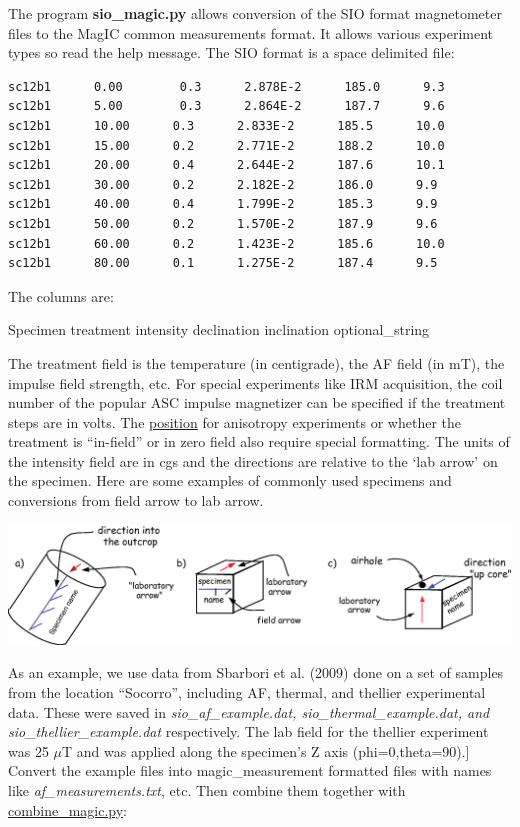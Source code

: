 \documentclass[11pt]{book}
\begin{document}
{{The program {\bf sio\_magic.py} allows conversion of the SIO format magnetometer files to the MagIC common measurements format.    It allows various experiment types so read the help message.    The SIO format is a space delimited file:


\begin{verbatim}
sc12b1      0.00        0.3      2.878E-2      185.0      9.3
sc12b1      5.00        0.3      2.864E-2      187.7      9.6
sc12b1      10.00      0.3      2.833E-2      185.5      10.0
sc12b1      15.00      0.2      2.771E-2      188.2      10.0
sc12b1      20.00      0.4      2.644E-2      187.6      10.1
sc12b1      30.00      0.2      2.182E-2      186.0      9.9
sc12b1      40.00      0.4      1.799E-2      185.3      9.9
sc12b1      50.00      0.2      1.570E-2      187.9      9.6
sc12b1      60.00      0.2      1.423E-2      185.6      10.0
sc12b1      80.00      0.1      1.275E-2      187.4      9.5
\end{verbatim}

The columns are:

Specimen    treatment   intensity   declination   inclination   optional\_string


The treatment field is the temperature (in centigrade), the AF field (in mT), the impulse field  strength, etc.  For special experiments like IRM acquisition, the  coil number of the popular ASC impulse magnetizer can be specified if the treatment steps are in volts.  The \href{#k15_magic.py}{position} for anisotropy experiments or whether the treatment is ``in-field'' or in zero field also require special formatting.  The units of the intensity field are in cgs and the directions are relative to the `lab arrow' on the specimen.  Here are some examples of commonly used specimens and conversions from field arrow to lab arrow.

\includegraphics[width=15cm]{EPSfiles/samples.eps}




As an example, we use data from Sbarbori et al. (2009) \nocite{sbarbori09} done on a set of samples  from the location ``Socorro'', including AF, thermal,  and thellier experimental data.  These were saved in {\it sio\_af\_example.dat, sio\_thermal\_example.dat, and sio\_thellier\_example.dat} respectively.  The lab field for the thellier experiment was 25 $\mu$T and was applied along the specimen's Z axis (phi=0,theta=90).]
   Convert the example files  into magic\_measurement formatted files with names like
    {\it af\_measurements.txt}, etc.    Then combine them together with \href{#combine_magic}{combine\_magic.py}:

}}
\end{document}

